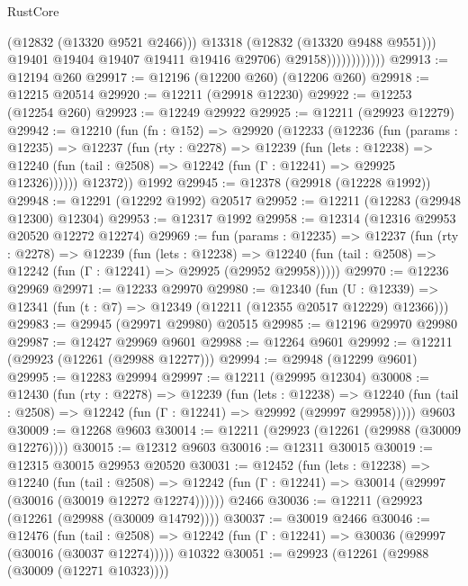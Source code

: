 \begin{lexlean}{RustCore}
\begin{coremodule}
                                  (@12832 (@13320 @9521 @2466)))
                                @13318
                                (@12832 (@13320 @9488 @9551)))
                              @19401
                              @19404
                              @19407
                              @19411
                              @19416
                              @29706)
                            @29158))))))))))))
@29913 := @12194 @260
@29917 := @12196 (@12200 @260) (@12206 @260)
@29918 := @12215 @20514
@29920 := @12211 (@29918 @12230)
@29922 := @12253 (@12254 @260)
@29923 := @12249 @29922
@29925 := @12211 (@29923 @12279)
@29942 := @12210
    (fun (fn : @152) =>
    @29920
      (@12233
        (@12236
          (fun (params : @12235) =>
          @12237
            (fun (rty : @2278) =>
            @12239
              (fun (lets : @12238) =>
              @12240 (fun (tail : @2508) => @12242 (fun (Γ : @12241) => @29925 @12326))))))
        @12372))
    @1992
@29945 := @12378 (@29918 (@12228 @1992))
@29948 := @12291 (@12292 @1992) @20517
@29952 := @12211 (@12283 (@29948 @12300) @12304)
@29953 := @12317 @1992
@29958 := @12314 (@12316 @29953 @20520 @12272 @12274)
@29969 := fun (params : @12235) =>
  @12237
    (fun (rty : @2278) =>
    @12239
      (fun (lets : @12238) =>
      @12240 (fun (tail : @2508) => @12242 (fun (Γ : @12241) => @29925 (@29952 @29958)))))
@29970 := @12236 @29969
@29971 := @12233 @29970
@29980 := @12340
    (fun (U : @12339) => @12341 (fun (t : @7) => @12349 (@12211 (@12355 @20517 @12229) @12366)))
@29983 := @29945 (@29971 @29980) @20515
@29985 := @12196 @29970 @29980
@29987 := @12427 @29969 @9601
@29988 := @12264 @9601
@29992 := @12211 (@29923 (@12261 (@29988 @12277)))
@29994 := @29948 (@12299 @9601)
@29995 := @12283 @29994
@29997 := @12211 (@29995 @12304)
@30008 := @12430
    (fun (rty : @2278) =>
    @12239
      (fun (lets : @12238) =>
      @12240 (fun (tail : @2508) => @12242 (fun (Γ : @12241) => @29992 (@29997 @29958)))))
    @9603
@30009 := @12268 @9603
@30014 := @12211 (@29923 (@12261 (@29988 (@30009 @12276))))
@30015 := @12312 @9603
@30016 := @12311 @30015
@30019 := @12315 @30015 @29953 @20520
@30031 := @12452
    (fun (lets : @12238) =>
    @12240
      (fun (tail : @2508) =>
      @12242 (fun (Γ : @12241) => @30014 (@29997 (@30016 (@30019 @12272 @12274))))))
    @2466
@30036 := @12211 (@29923 (@12261 (@29988 (@30009 @14792))))
@30037 := @30019 @2466
@30046 := @12476
    (fun (tail : @2508) => @12242 (fun (Γ : @12241) => @30036 (@29997 (@30016 (@30037 @12274)))))
    @10322
@30051 := @29923 (@12261 (@29988 (@30009 (@12271 @10323))))

\end{coremodule}
\end{lexlean}
